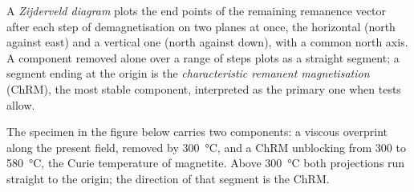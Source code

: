 \begin{definition}\label{def:b3:palaeomagnetism:zijderveld}
A \emph{Zijderveld diagram} plots the end points of
the remaining remanence vector after each step of demagnetisation on two planes
at once, the horizontal (north against east) and a vertical one (north
against down), with a common north axis. A component removed alone over a range
of steps plots as a straight segment; a segment ending at the origin is the
\emph{characteristic remanent magnetisation}
(ChRM), the most stable component, interpreted as the primary
one when tests allow.
\end{definition}

The specimen in the figure below carries two components: a viscous overprint
along the present field, removed by \qty{300}{\celsius}, and a ChRM
unblocking from 300 to \qty{580}{\celsius}, the Curie temperature of magnetite.
Above \qty{300}{\celsius} both projections run straight to the origin; the
direction of that segment is the ChRM.

